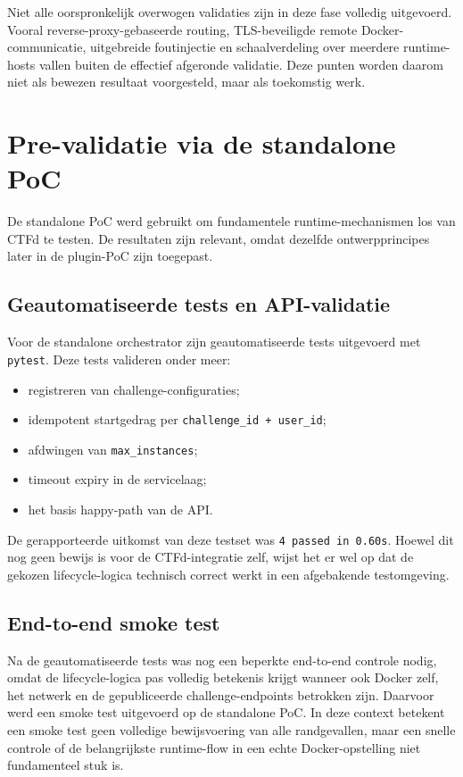 Niet alle oorspronkelijk overwogen validaties zijn in deze fase volledig uitgevoerd. Vooral reverse-proxy-gebaseerde routing, TLS-beveiligde remote Docker-communicatie, uitgebreide foutinjectie en schaalverdeling over meerdere runtime-hosts vallen buiten de effectief afgeronde validatie. Deze punten worden daarom niet als bewezen resultaat voorgesteld, maar als toekomstig werk.

\section{Pre-validatie via de standalone PoC}%
\label{sec:validatie-standalone}

De standalone PoC werd gebruikt om fundamentele runtime-mechanismen los van CTFd te testen. De resultaten zijn relevant, omdat dezelfde ontwerpprincipes later in de plugin-PoC zijn toegepast.

\subsection{Geautomatiseerde tests en API-validatie}

Voor de standalone orchestrator zijn geautomatiseerde tests uitgevoerd met \texttt{pytest}. Deze tests valideren onder meer:

\begin{itemize}
  \item registreren van challenge-configuraties;
  \item idempotent startgedrag per \texttt{challenge\_id + user\_id};
  \item afdwingen van \texttt{max\_instances};
  \item timeout expiry in de servicelaag;
  \item het basis happy-path van de API.
\end{itemize}

De gerapporteerde uitkomst van deze testset was \texttt{4 passed in 0.60s}. Hoewel dit nog geen bewijs is voor de CTFd-integratie zelf, wijst het er wel op dat de gekozen lifecycle-logica technisch correct werkt in een afgebakende testomgeving.

\subsection{End-to-end smoke test}

Na de geautomatiseerde tests was nog een beperkte end-to-end controle nodig, omdat de lifecycle-logica pas volledig betekenis krijgt wanneer ook Docker zelf, het netwerk en de gepubliceerde challenge-endpoints betrokken zijn. Daarvoor werd een smoke test uitgevoerd op de standalone PoC. In deze context betekent een smoke test geen volledige bewijsvoering van alle randgevallen, maar een snelle controle of de belangrijkste runtime-flow in een echte Docker-opstelling niet fundamenteel stuk is.

